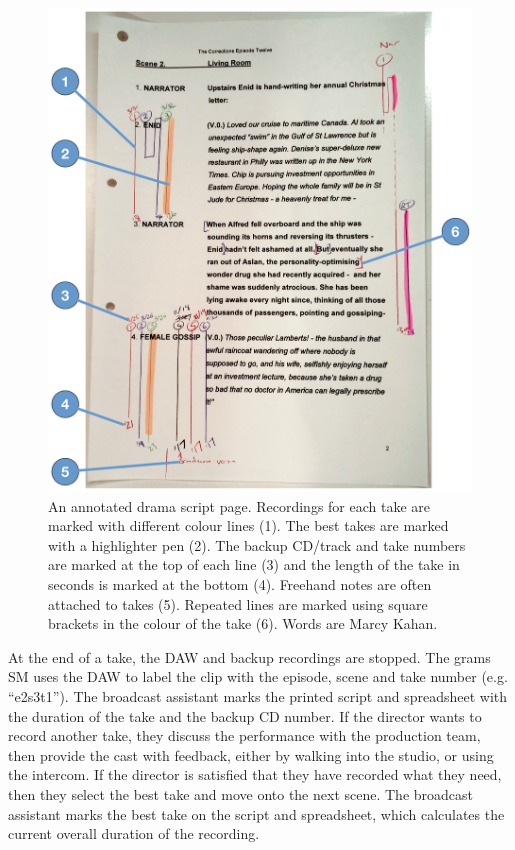 \begin{figure}
  \centering
  \includegraphics[width=\columnwidth]{figs/drama-markup-labelled.pdf}
  \caption{An annotated drama script page. Recordings for each take are marked with different colour lines (1). The
    best takes are marked with a highlighter pen (2). The backup CD/track and take numbers are marked at the top of
    each line (3) and the length of the take in seconds is marked at the bottom (4). Freehand notes are often attached
    to takes (5). Repeated lines are marked using square brackets in the colour of the take (6). Words are
     Marcy Kahan.} \label{fig:drama-script} \end{figure}

At the end of a take, the DAW and backup recordings are stopped. The grams SM uses the DAW to label the clip with the
episode, scene and take number (e.g. ``e2s3t1''). The broadcast assistant marks the printed script and spreadsheet with
the duration of the take and the backup CD number.  If the director wants to record another take, they discuss the
performance with the production team, then provide the cast with feedback, either by walking into the studio, or using
the intercom.  If the director is satisfied that they have recorded what they need, then they select the best take and
move onto the next scene. The broadcast assistant marks the best take on the script and spreadsheet, which calculates
the current overall duration of the recording.

